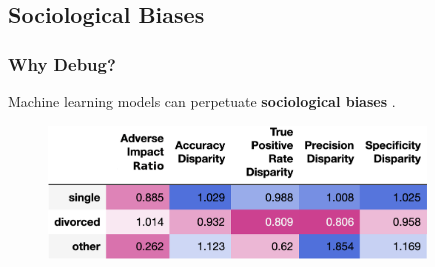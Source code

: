 \documentclass[11pt,
               aspectratio=169,
               hyperref={colorlinks}
               ]{beamer}
\begin{document}
		\subsection{Sociological Biases}
	
			\begin{frame}[label={slide:disp}]
		
				\frametitle{Why Debug?}
		
				\footnotesize{Machine learning models can perpetuate \textbf{sociological biases} \cite{barocas-hardt-narayanan}.}
				\vspace{10pt}	
				\begin{figure}
					\begin{center}
						\includegraphics[height=100pt]{img/di.png}
					\end{center}
				\end{figure}
				\normalsize
		
			\end{frame}
	
\end{document}
